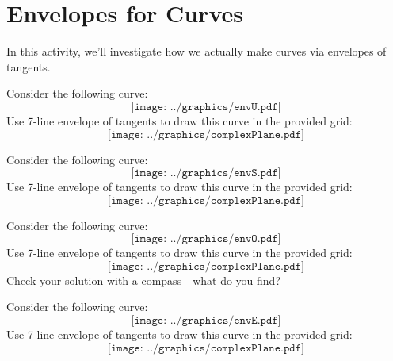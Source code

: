 \newpage
\section{Envelopes for Curves}

In this activity, we'll investigate how we actually make curves via
envelopes of tangents.


\begin{prob}
Consider the following curve:
\[
\texttt{[image: ../graphics/envU.pdf]}
\]
Use 7-line envelope of tangents to draw this curve in the provided
grid:
\[
\texttt{[image: ../graphics/complexPlane.pdf]}
\]
\end{prob}


\break


\begin{prob}
Consider the following curve:
\[
\texttt{[image: ../graphics/envS.pdf]}
\]
Use 7-line envelope of tangents to draw this curve in the provided
grid:
\[
\texttt{[image: ../graphics/complexPlane.pdf]}
\]
\end{prob}

\break

\begin{prob}
Consider the following curve:
\[
\texttt{[image: ../graphics/envO.pdf]}
\]
Use 7-line envelope of tangents to draw this curve in the provided
grid:
\[
\texttt{[image: ../graphics/complexPlane.pdf]}
\]
Check your solution with a compass---what do you find?
\end{prob}

\break

\begin{prob}
Consider the following curve:
\[
\texttt{[image: ../graphics/envE.pdf]}
\]
Use 7-line envelope of tangents to draw this curve in the provided
grid:
\[
\texttt{[image: ../graphics/complexPlane.pdf]}
\]
\end{prob}
